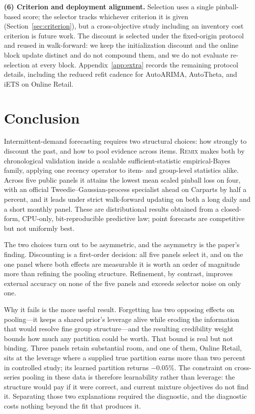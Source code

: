 \documentclass[twocolumn,10pt]{article}
\theoremstyle{definition}
\newcommand{\REMIX}{\textsc{Remix}}
\begin{document}
\textbf{(6) Criterion and deployment alignment.} Selection uses a single
pinball-based score; the selector tracks whichever criterion it is given
(Section~\ref{sec:criterion}), but a cross-objective study including an
inventory cost criterion is future work. The discount is selected under
the fixed-origin protocol and reused in walk-forward: we keep the
initialization discount and the online block update distinct and do not
compound them, and we do not evaluate re-selection at every block.
Appendix~\ref{app:extra} records the remaining protocol details, including
the reduced refit cadence for AutoARIMA, AutoTheta, and iETS on Online
Retail.

\section{Conclusion}\label{sec:conclusion}

Intermittent-demand forecasting requires two structural choices: how
strongly to discount the past, and how to pool evidence across items.
\REMIX{} makes both by chronological validation inside a scalable
sufficient-statistic empirical-Bayes family, applying one recency operator
to item- and group-level statistics alike. Across five public panels it
attains the lowest mean scaled pinball loss on four, with an official
Tweedie--Gaussian-process specialist ahead on Carparts by half a percent,
and it leads under strict walk-forward updating on both a long daily and a
short monthly panel. These are distributional results obtained from a
closed-form, CPU-only, bit-reproducible predictive law; point forecasts
are competitive but not uniformly best.

The two choices turn out to be asymmetric, and the asymmetry is the
paper's finding. Discounting is a first-order decision: all five panels
select it, and on the one panel where both effects are measurable it is
worth an order of magnitude more than refining the pooling structure.
Refinement, by contrast, improves external accuracy on none of the five
panels and exceeds selector noise on only one.

Why it fails is the more useful result. Forgetting has two opposing
effects on pooling---it keeps a shared prior's leverage alive while
eroding the information that would resolve fine group structure---and the
resulting credibility weight bounds how much any partition could be worth.
That bound is real but not binding. Three panels retain substantial room,
and one of them, Online Retail, sits at the leverage where a supplied true
partition earns more than two percent in controlled study; its learned
partition returns $-0.05\%$. The constraint on cross-series pooling in
these data is therefore learnability rather than leverage: the structure
would pay if it were correct, and current mixture objectives do not find
it. Separating those two explanations required the diagnostic, and the
diagnostic costs nothing beyond the fit that produces it.
\end{document}

